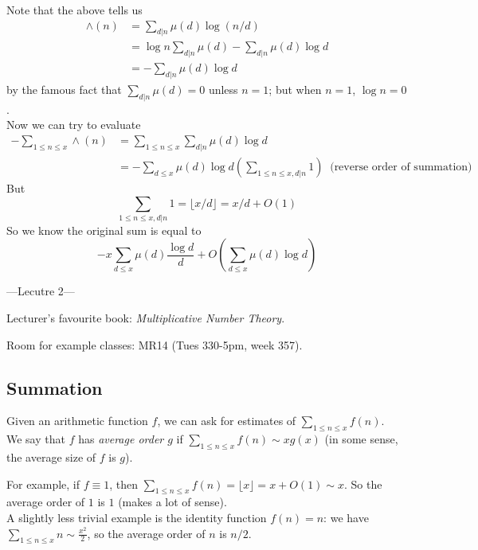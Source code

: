 \documentclass[a4paper]{article}
\begin{document}
Note that the above tells us
\begin{equation*}
\begin{aligned}
\wedge(n) &= \sum_{d|n} \mu(d) \log(n/d)\\
&=\log n \sum_{d|n}\mu(d) - \sum_{d|n} \mu(d)\log d\\
&= -\sum_{d|n} \mu(d)\log d
\end{aligned}
\end{equation*}
by the famous fact that $\sum_{d|n}\mu(d)=0$ unless $n=1$; but when $n=1$, $\log n = 0$.\\
Now we can try to evaluate
\begin{equation*}
\begin{aligned}
-\sum_{1 \leq n \leq x} \wedge(n) &= \sum_{1 \leq n \leq x} \sum_{d|n} \mu(d) \log d \\
&= -\sum_{d \leq x} \mu(d) \log d (\sum_{1 \leq n \leq x, d|n} 1)\ \text{ (reverse order of summation)}
\end{aligned}
\end{equation*}
But
$$\sum_{1 \leq n \leq x, d|n} 1 = \lfloor x/d \rfloor = x/d + O(1)$$
So we know the original sum is equal to
$$-x\sum_{d \leq x} \mu(d) \frac{\log d}{d} + O(\sum_{d \leq x} \mu(d) \log d)$$

---Lecutre 2---

Lecturer's favourite book: \emph{Multiplicative Number Theory}.

Room for example classes: MR14 (Tues 330-5pm, week 357).

\subsection{Summation}
Given an arithmetic function $f$, we can ask for estimates of $\sum_{1 \leq n \leq x} f(n)$.\\
We say that $f$ has \emph{average order $g$} if $\sum_{1 \leq n \leq x} f(n) \sim xg(x)$ (in some sense, the average size of $f$ is $g$).

For example, if $f \equiv 1$, then $\sum_{1 \leq n \leq x} f(n) = \lfloor x \rfloor = x+O(1) \sim x$. So the average order of $1$ is $1$ (makes a lot of sense).\\
A slightly less trivial example is the identity function $f(n) = n$: we have $\sum_{1 \leq n \leq x} n \sim \frac{x^2}{2}$, so the average order of $n$ is $n/2$.
\end{document}
